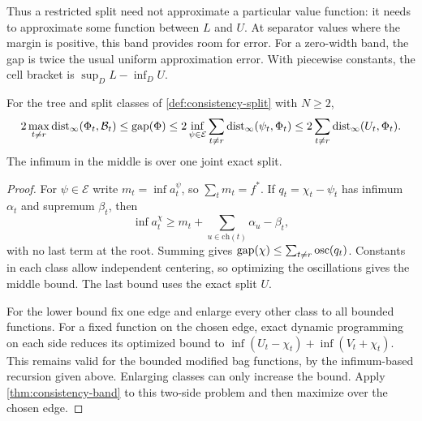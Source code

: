 Thus a restricted split need not approximate a particular value function:
it needs to approximate some function between $L$ and $U$.  At separator
values where the margin is positive, this band provides room for error.
For a zero-width band, the gap is twice the usual uniform approximation
error.  With piecewise constants, the cell bracket is
$\sup_D L-\inf_D U$.

\begin{theorem}
\label{thm:consistency-tree}
For the tree and split classes of \cref{def:consistency-split} with
$N\ge2$,
\begin{equation}
\label{eq:consistency-tree}
 2\max_{t\ne r}\operatorname{dist}_\infty(\Phi_t,\mathcal B_t)
 \le\operatorname{gap}(\Phi)
 \le2\inf_{\psi\in\mathcal E}\sum_{t\ne r}\operatorname{dist}_\infty(\psi_t,\Phi_t)
 \le2\sum_{t\ne r}\operatorname{dist}_\infty(U_t,\Phi_t).
\end{equation}
The infimum in the middle is over one joint exact split.
\end{theorem}

\begin{proof}
For $\psi\in\mathcal E$ write $m_t=\inf a_t^\psi$, so
$\sum_tm_t=f^*$.  If $q_t=\chi_t-\psi_t$ has infimum $\alpha_t$ and
supremum $\beta_t$, then
\[
 \inf a_t^\chi\ge m_t+\sum_{u\in\mathrm{ch}(t)}\alpha_u-\beta_t,
\]
with no last term at the root.  Summing gives
$\operatorname{gap}(\chi)\le\sum_{t\ne r}\operatorname{osc}(q_t)$.
Constants in each class allow independent centering, so optimizing the
oscillations gives the middle bound.  The last bound uses the exact split
$U$.

For the lower bound fix one edge and enlarge every other class to all
bounded functions.  For a fixed function on the chosen edge, exact
dynamic programming on each side reduces its optimized bound to
$\inf(U_t-\chi_t)+\inf(V_t+\chi_t)$.
This remains valid for the bounded modified bag functions, by the
infimum-based recursion given above.  Enlarging classes can only increase
the bound.  Apply \cref{thm:consistency-band} to this two-side problem
and then maximize over the chosen edge.
\end{proof}

